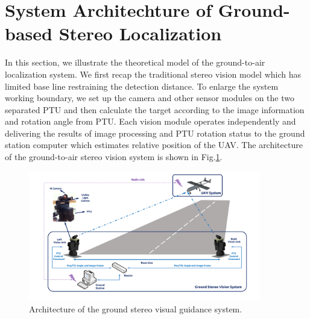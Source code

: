 



\section{System Architechture of Ground-based Stereo Localization}
In this section, we illustrate the theoretical model of the ground-to-air localization system. We first recap the traditional stereo vision model which has limited base line restraining the detection distance. To enlarge the system working boundary, we set up the camera and other sensor modules on the two separated PTU and then calculate the target according to the image information and rotation angle from PTU. Each vision module operates independently and delivering the results of image processing and PTU rotation status to the ground station computer which estimates relative position of the UAV. The architecture of the ground-to-air stereo vision system is shown in Fig.\ref{fig:SystemStructure}.


\begin{figure}[!tb]
	\centering
	\includegraphics[width=0.9\textwidth]{Figs/SystemStructure2.pdf}
	\caption{Architecture of the ground stereo visual guidance system.}
	\label{fig:SystemStructure}
\end{figure}




